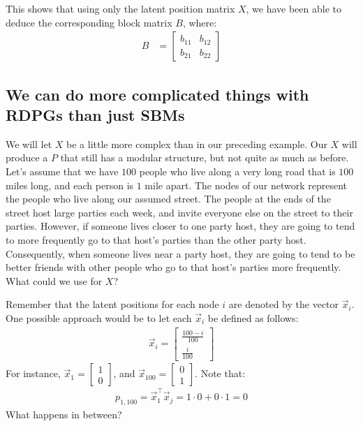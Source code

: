\documentclass[letterpaper,10pt,english]{jupyterBook}
\begin{document}
\sphinxAtStartPar
This shows that using only the latent position matrix \(X\), we have been able to deduce the corresponding block matrix \(B\), where:
\begin{align*}
    B &= \begin{bmatrix}
        b_{11} & b_{12} \\
        b_{21} & b_{22}
    \end{bmatrix}
\end{align*}

\subsection{We can do more complicated things with RDPGs than just SBMs}
\label{\detokenize{representations/ch5/single-network-models_RDPG:we-can-do-more-complicated-things-with-rdpgs-than-just-sbms}}
\sphinxAtStartPar
We will let \(X\) be a little more complex than in our preceding example. Our \(X\) will produce a \(P\) that still  has a modular structure, but not quite as much as before. Let’s assume that we have \(100\) people who live along a very long road that is \(100\) miles long, and each person is \(1\) mile apart. The nodes of our network represent the people who live along our assumed street. The people at the ends of the street host large parties each week, and invite everyone else on the street to their parties. However, if someone lives closer to one party host, they are going to tend to more frequently go to that host’s parties than the other party host. Consequently, when someone lives near a party host, they are going to tend to be better friends with other people who go to that host’s parties more frequently. What could we use for \(X\)?

\sphinxAtStartPar
Remember that the latent positions for each node \(i\) are denoted by the vector \(\vec x_i\). One possible approach would be to let each \(\vec x_i\) be defined as follows:
\begin{align*}
    \vec x_i = \begin{bmatrix}
        \frac{100 - i}{100} \\
        \frac{i}{100}
    \end{bmatrix}
\end{align*}
\sphinxAtStartPar
For instance, \(\vec x_1 = \begin{bmatrix}1 \\ 0\end{bmatrix}\), and \(\vec x_{100} = \begin{bmatrix} 0 \\ 1\end{bmatrix}\). Note that:
\begin{align*}
p_{1,100} = \vec x_1^\top \vec x_j = 1 \cdot 0 + 0 \cdot 1 = 0
\end{align*}
\sphinxAtStartPar
What happens in between?
\end{document}
